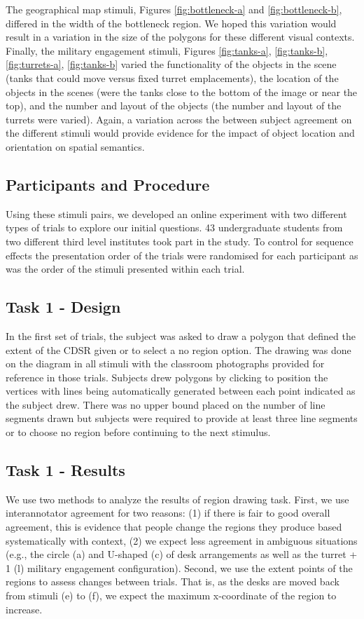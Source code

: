 \documentclass[11pt,letterpaper]{article}
\begin{document}
The geographical map stimuli, Figures \ref{fig:bottleneck-a} and \ref{fig:bottleneck-b}, differed in the width of the bottleneck region. We hoped this variation would result in a variation in the size of the polygons for these different visual contexts. Finally, the military engagement stimuli, Figures \ref{fig:tanks-a}, \ref{fig:tanks-b}, \ref{fig:turrets-a}, \ref{fig:tanks-b} varied the functionality of the objects in the scene (tanks that could move versus fixed turret emplacements), the location of the objects in the scenes (were the tanks close to the bottom of the image or near the top), and the number and layout of the objects (the number and layout of the turrets were varied). Again, a variation across the between subject agreement on the different stimuli would provide evidence for the impact of object location and orientation on spatial semantics.

\subsection{Participants and Procedure}
Using these stimuli pairs, we developed an online experiment with two different types of trials to explore our initial questions. 43 undergraduate students from two different third level institutes took part in the study. To control for sequence effects the presentation order of the trials were randomised for each participant as was the order of the stimuli presented within each trial.   

\subsection{Task 1 - Design}
In the first set of trials, the subject was asked to draw a polygon that defined the extent of the CDSR given or to select a no region option.  The drawing was done on the diagram in all stimuli with the classroom photographs provided for reference in those trials.  Subjects drew polygons by clicking to position the vertices with lines being automatically generated between each point indicated as the subject drew.  There was no upper bound placed on the number of line segments drawn but subjects were required to provide at least three line segments or to choose no region before continuing to the next stimulus.

\subsection{Task 1 - Results}
We use two methods to analyze the results of region drawing task.  First, we use interannotator agreement for two reasons: (1) if there is fair to good overall agreement, this is evidence that people change the regions they produce based systematically with context, (2) we expect less agreement in ambiguous situations (e.g., the circle (a) and U-shaped (c) of desk arrangements as well as the turret + 1 (l) military engagement configuration).  Second, we use the extent points of the regions to assess changes between trials.  That is, as the desks are moved back from stimuli (e) to (f), we expect the maximum x-coordinate of the region to increase.
\end{document}
